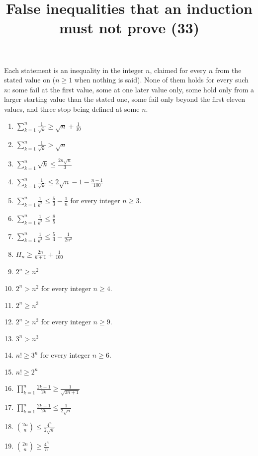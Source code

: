\documentclass[11pt,a4paper]{article}
\title{False inequalities that an induction must not prove (33)}
\author{}
\date{}
\begin{document}
\maketitle
Each statement is an inequality in the integer $n$, claimed for every $n$ from the stated value on ($n \ge 1$ when nothing is said). None of them holds for every such $n$: some fail at the first value, some at one later value only, some hold only from a larger starting value than the stated one, some fail only beyond the first eleven values, and three stop being defined at some $n$.

\begin{enumerate}
\item $\displaystyle \sum_{k=1}^{n} \frac{1}{\sqrt{k}} \ge \sqrt{n} + \frac{1}{10}$
\item $\displaystyle \sum_{k=1}^{n} \frac{1}{\sqrt{k}} > \sqrt{n}$
\item $\displaystyle \sum_{k=1}^{n} \sqrt{k} \le \frac{2n\sqrt{n}}{3}$
\item $\displaystyle \sum_{k=1}^{n} \frac{1}{\sqrt{k}} \le 2\sqrt{n} - 1 - \frac{n - 1}{100}$
\item $\displaystyle \sum_{k=1}^{n} \frac{1}{k^{2}} \le \frac{5}{3} - \frac{1}{n}$ for every integer $n\ge 3$.
\item $\displaystyle \sum_{k=1}^{n} \frac{1}{k^{2}} \le \frac{8}{5}$
\item $\displaystyle \sum_{k=1}^{n} \frac{1}{k^{3}} \le \frac{5}{4} - \frac{1}{2n^{2}}$
\item $\displaystyle H_{n} \ge \frac{2n}{n + 1} + \frac{1}{100}$
\item $\displaystyle 2^{n} \ge n^{2}$
\item $\displaystyle 2^{n} > n^{2}$ for every integer $n\ge 4$.
\item $\displaystyle 2^{n} \ge n^{3}$
\item $\displaystyle 2^{n} \ge n^{3}$ for every integer $n\ge 9$.
\item $\displaystyle 3^{n} > n^{3}$
\item $\displaystyle n! \ge 3^{n}$ for every integer $n\ge 6$.
\item $\displaystyle n! \ge 2^{n}$
\item $\displaystyle \prod_{k=1}^{n} \frac{2k - 1}{2k} \ge \frac{1}{\sqrt{3n + 1}}$
\item $\displaystyle \prod_{k=1}^{n} \frac{2k - 1}{2k} \le \frac{1}{2\sqrt{n}}$
\item $\displaystyle \binom{2n}{n} \le \frac{4^{n}}{2\sqrt{n}}$
\item $\displaystyle \binom{2n}{n} \ge \frac{4^{n}}{n}$

\end{enumerate}
\end{document}
